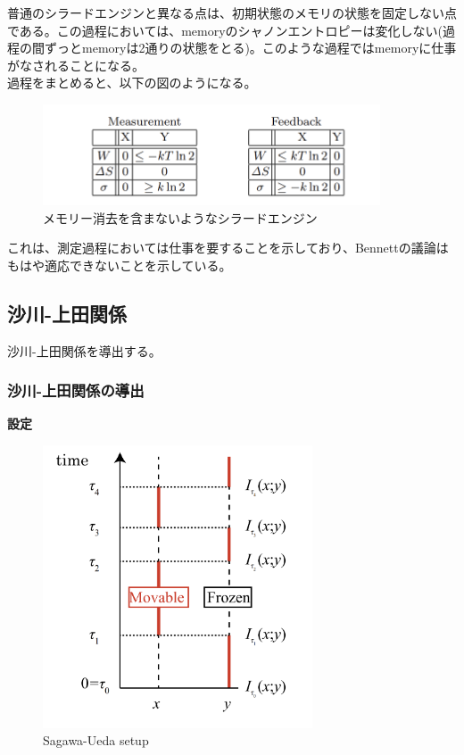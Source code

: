 \documentclass[a4paper,11pt]{jsarticle}
\numberwithin{equation}{section}
\begin{document}
普通のシラードエンジンと異なる点は、初期状態のメモリの状態を固定しない点である。この過程においては、memoryのシャノンエントロピーは変化しない(過程の間ずっとmemoryは2通りの状態をとる)。このような過程ではmemoryに仕事がなされることになる。\\
過程をまとめると、以下の図のようになる。\\
\begin{figure}[H]
    \begin{center}
    \includegraphics[width=100mm]{cycle.png}
    \end{center}
    \caption{メモリー消去を含まないようなシラードエンジン}
    \label{fig:cycle}
\end{figure}
これは、測定過程においては仕事を要することを示しており、Bennettの議論はもはや適応できないことを示している。\\

\newpage
\subsection{沙川-上田関係}
沙川-上田関係を導出する。\\
\subsubsection{沙川-上田関係の導出}
\textbf{設定}\\
\begin{figure}[H]
    \begin{center}
    \includegraphics[width=80mm]{Sagawa.png}
    \end{center}
    \caption{Sagawa-Ueda setup}
    \label{fig:Sagawa}
\end{figure}
\end{document}
